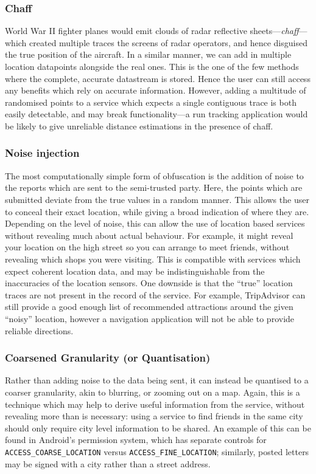 \documentclass{IOS-Book-Article}     %
\newcommand{\tbox}[3][red]{{
\color{#1}\noindent{
   \fbox{\scriptsize{ {\bf #2} \textsl{#3}}}
   \vspace{2pt}
}
}}
\newcommand{\todo}[1]{\tbox{TODO:}{#1}}
\begin{document}
\subsubsection{Chaff}

World War II fighter planes would emit clouds of radar reflective
sheets---\emph{chaff}---which created multiple traces the screens of radar
operators, and hence disguised the true position of the aircraft. In a similar
manner, we can add in multiple location datapoints alongside the real ones. This
is the one of the few methods where the complete, accurate datastream is stored.
Hence the user can still access any benefits which rely on accurate information. However,
adding a multitude of randomised points to a service which expects a single
contiguous trace is both easily detectable, and may break functionality---a
run tracking application would be likely to give unreliable distance estimations
in the presence of chaff.

\subsubsection{Noise injection}

The most computationally simple form of obfuscation is the addition of noise to
the reports which are sent to the semi-trusted party. Here, the points which are
submitted deviate from the true values in a random manner. This allows the user
to conceal their exact location, while giving a broad indication of where they
are. Depending on the level of noise, this can allow the use of location
based services without revealing much about actual behaviour. For example, it
might reveal your location on the high street so you can arrange to meet
friends, without revealing which shops you were visiting. This is compatible
with services which expect coherent location data, and may be indistinguishable
from the inaccuracies of the location sensors. One downside is that the ``true''
location traces are not present in the record of the service.
For example, TripAdvisor can still provide a good enough list of recommended 
attractions around the given ``noisy'' location, however a navigation 
application will not be able to provide reliable directions.

\subsubsection{Coarsened Granularity (or Quantisation)}

Rather than adding noise to the data being sent, it can instead be quantised to
a coarser granularity, akin to blurring, or zooming out on a map. Again, this is
a technique which may help to derive useful information from the service,
without revealing more than is necessary: using a service to find friends in the
same city should only require city level information to be shared. An example of
this can be found in Android's permission system, which has separate controls
for \verb|ACCESS_COARSE_LOCATION| versus \verb|ACCESS_FINE_LOCATION|; similarly,
posted letters may be signed with a city rather than a street address.
\end{document}

